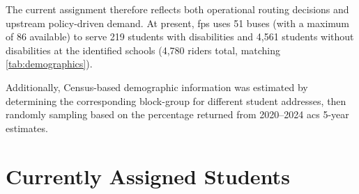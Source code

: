 The current assignment therefore reflects both operational routing decisions and upstream policy-driven demand. At present, \gls{fps} uses 51 buses (with a maximum of 86 available) to serve 219 students with disabilities and 4,561 students without disabilities at the identified schools (4,780 riders total, matching \autoref{tab:demographics}).

Additionally, Census-based demographic information was estimated by determining the corresponding block-group for different student addresses, then randomly sampling based on the percentage returned from 2020--2024 \gls{acs} 5-year estimates.

\begin{table}[!htbp]
    \caption{\gls{fps} student demographics and average home-to-school distance by student group, reported in miles. Categories are not mutually exclusive; a student may belong to multiple rows.}
    \label{tab:demographics}
\end{table}

\section{Currently Assigned Students}

